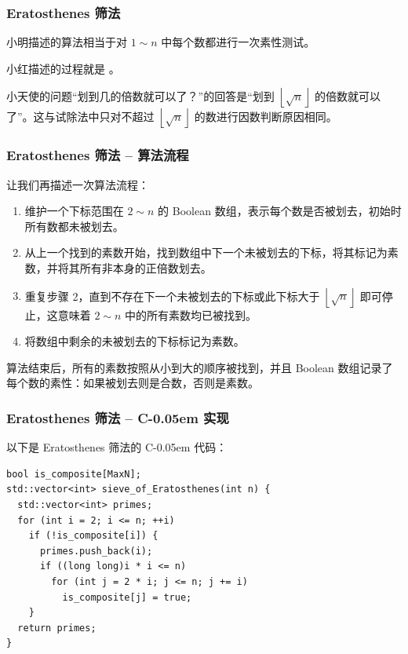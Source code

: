 \documentclass{../pkslide}
\newcommand{\Cpp}{\texorpdfstring{C\kern-0.05em\protect\raisebox{.35ex}{\textsmaller[2]{+\kern-0.05em+}}}{C++}}
\begin{document}
\begin{frame}
  \frametitle{Eratosthenes 筛法}
  小明描述的算法相当于对 $1 \sim n$ 中每个数都进行一次素性测试。
  
  \pause
  小红描述的过程就是 。
  
  \pause
  小天使的问题“划到几的倍数就可以了？”的回答是“划到 $\left\lfloor \sqrt{n} \right\rfloor$ 的倍数就可以了”。这与试除法中只对不超过 $\left\lfloor \sqrt{n} \right\rfloor$ 的数进行因数判断原因相同。
\end{frame}

\begin{frame}
  \frametitle{Eratosthenes 筛法 -- 算法流程}
  让我们再描述一次算法流程：
  
  \pause
  \begin{enumerate}
    \item 维护一个下标范围在 $2 \sim n$ 的 Boolean 数组，表示每个数是否被划去，初始时所有数都未被划去。
      \pause
    \item 从上一个找到的素数开始，找到数组中下一个未被划去的下标，将其标记为素数，并将其所有非本身的正倍数划去。
      \pause
    \item 重复步骤 2，直到不存在下一个未被划去的下标或此下标大于 $\left\lfloor \sqrt{n} \right\rfloor$ 即可停止，这意味着 $2 \sim n$ 中的所有素数均已被找到。
      \pause
    \item 将数组中剩余的未被划去的下标标记为素数。
  \end{enumerate}
  
  \pause
  \emptyline
  算法结束后，所有的素数按照从小到大的顺序被找到，并且 Boolean 数组记录了每个数的素性：如果被划去则是合数，否则是素数。
\end{frame}

\begin{frame}[fragile]
  \frametitle{Eratosthenes 筛法 -- \Cpp{} 实现}
  以下是 Eratosthenes 筛法的 \Cpp{} 代码：
  
\begin{verbatim}
bool is_composite[MaxN];
std::vector<int> sieve_of_Eratosthenes(int n) {
  std::vector<int> primes;
  for (int i = 2; i <= n; ++i)
    if (!is_composite[i]) {
      primes.push_back(i);
      if ((long long)i * i <= n)
        for (int j = 2 * i; j <= n; j += i)
          is_composite[j] = true;
    }
  return primes;
}
\end{verbatim}
  
\end{frame}
\end{document}
